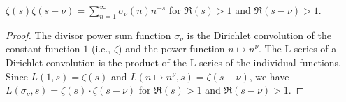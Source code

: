 \begin{theorem}
\label{LSeries_sigma_eq_riemannZeta_mul}
\leanok
$\zeta(s)\zeta(s - \nu) = \sum_{n=1}^{\infty} \sigma_\nu(n) n^{-s}$ for $\Re(s) > 1$ and $\Re(s - \nu) > 1$.
\end{theorem}
\begin{proof}
\leanok
The divisor power sum function $\sigma_\nu$ is the Dirichlet convolution of the constant function $1$ (i.e., $\zeta$) and the power function $n \mapsto n^\nu$. The L-series of a Dirichlet convolution is the product of the L-series of the individual functions. Since $L(1, s) = \zeta(s)$ and $L(n \mapsto n^\nu, s) = \zeta(s - \nu)$, we have $L(\sigma_\nu, s) = \zeta(s) \cdot \zeta(s - \nu)$ for $\Re(s) > 1$ and $\Re(s - \nu) > 1$.
\end{proof}

